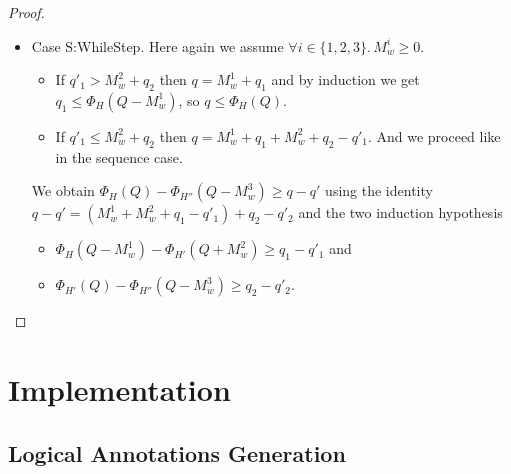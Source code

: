 \documentclass[nocopyrightspace,preprint]{sigplanconf}
\begin{document}
\begin{proof}
\begin{itemize}
\item Case {\sc S:WhileStep}.
  Here again we assume $\forall i \in \{1, 2, 3\}.\, M_w^i \ge 0$.
  \begin{itemize}[topsep=0pt]
  \item
    If $q'_1 > M_w^2 + q_2$ then $q = M_w^1 + q_1$ and by induction
    we get $q_1 \le \Phi_H(Q - M_w^1)$, so $q \le \Phi_H(Q)$.
  \item
    If $q'_1 \le M_w^2 + q_2$ then $q = M_w^1 + q_1 + M_w^2 + q_2 - q'_1$.
    And we proceed like in the sequence case.
  \end{itemize}
  We obtain $\Phi_H(Q) - \Phi_{H''}(Q - M_w^3) \ge q - q'$ using the identity
  $q - q' = (M_w^1 + M_w^2 + q_1 - q'_1) + q_2 - q'_2$ and the two
  induction hypothesis
  \begin{itemize}[topsep=0pt]
  \item $\Phi_H(Q - M_w^1) - \Phi_{H'}(Q + M_w^2) \ge q_1 - q'_1$ and
  \item $\Phi_{H'}(Q) - \Phi_{H''}(Q - M_w^3) \ge q_2 - q'_2.$
  \end{itemize}

\end{itemize}
\end{proof}

\section{Implementation}

\subsection{Logical Annotations Generation}
\end{document}

